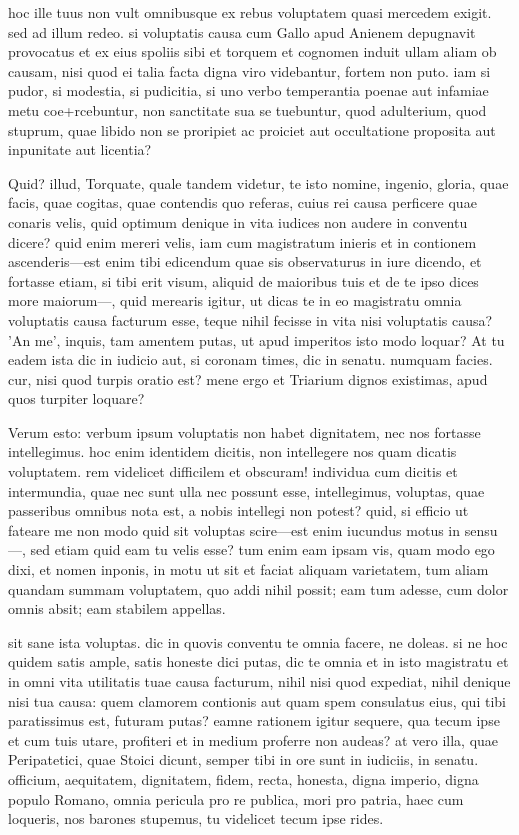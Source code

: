  hoc ille tuus non vult omnibusque ex rebus voluptatem quasi mercedem exigit. sed ad illum redeo. si voluptatis causa cum Gallo apud Anienem depugnavit provocatus et ex eius spoliis sibi et torquem et cognomen induit ullam aliam ob causam, nisi quod ei talia facta digna viro videbantur, fortem non puto. iam si pudor, si modestia, si pudicitia, si uno verbo temperantia poenae aut infamiae metu coe+rcebuntur, non sanctitate sua se tuebuntur, quod adulterium, quod stuprum, quae libido non se proripiet ac proiciet aut occultatione proposita aut inpunitate aut licentia?

 Quid? illud, Torquate, quale tandem videtur, te isto nomine, ingenio, gloria, quae facis, quae cogitas, quae contendis quo referas, cuius rei causa perficere quae conaris velis, quid optimum denique in vita iudices non audere in conventu dicere? quid enim mereri velis, iam cum magistratum inieris et in contionem ascenderis—est enim tibi edicendum quae sis observaturus in iure dicendo, et fortasse etiam, si tibi erit visum, aliquid de maioribus tuis et de te ipso dices more maiorum—, quid merearis igitur, ut dicas te in eo magistratu omnia voluptatis causa facturum esse, teque nihil fecisse in vita nisi voluptatis causa? 'An me', inquis, tam amentem putas, ut apud imperitos isto modo loquar? At tu eadem ista dic in iudicio aut, si coronam times, dic in senatu. numquam facies. cur, nisi quod turpis oratio est? mene ergo et Triarium dignos existimas, apud quos turpiter loquare?

 Verum esto: verbum ipsum voluptatis non habet dignitatem, nec nos fortasse intellegimus. hoc enim identidem dicitis, non intellegere nos quam dicatis voluptatem. rem videlicet difficilem et obscuram! individua cum dicitis et intermundia, quae nec sunt ulla nec possunt esse, intellegimus, voluptas, quae passeribus omnibus nota est, a nobis intellegi non potest? quid, si efficio ut fateare me non modo quid sit voluptas scire—est enim iucundus motus in sensu—, sed etiam quid eam tu velis esse? tum enim eam ipsam vis, quam modo ego dixi, et nomen inponis, in motu ut sit et faciat aliquam varietatem, tum aliam quandam summam voluptatem, quo addi nihil possit; eam tum adesse, cum dolor omnis absit; eam stabilem appellas.

 sit sane ista voluptas. dic in quovis conventu te omnia facere, ne doleas. si ne hoc quidem satis ample, satis honeste dici putas, dic te omnia et in isto magistratu et in omni vita utilitatis tuae causa facturum, nihil nisi quod expediat, nihil denique nisi tua causa: quem clamorem contionis aut quam spem consulatus eius, qui tibi paratissimus est, futuram putas? eamne rationem igitur sequere, qua tecum ipse et cum tuis utare, profiteri et in medium proferre non audeas? at vero illa, quae Peripatetici, quae Stoici dicunt, semper tibi in ore sunt in iudiciis, in senatu. officium, aequitatem, dignitatem, fidem, recta, honesta, digna imperio, digna populo Romano, omnia pericula pro re publica, mori pro patria, haec cum loqueris, nos barones stupemus, tu videlicet tecum ipse rides.

